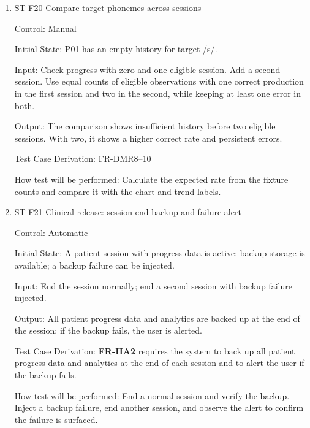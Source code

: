 \documentclass[12pt, titlepage]{article}
\begin{document}
\begin{enumerate}
Control: Manual

Initial State: An authorized auditor and synthetic patient P01 are available.

Input: Create, view, modify, export, and confirm deletion of P01. Retrieve and copy the audit log.

Output: Each operation is logged with action, information type, timestamp, actor, and patient reference. Prior events and the deletion event remain available to the authorized auditor after deletion.

Test Case Derivation: FR-DMR4, FR-DMR5 and FR-HA9

How test will be performed: Compare the captured events with the action sequence and verify retained audit history after the clinical record is removed.

\item{ST-F20 Compare target phonemes across sessions\\}

Control: Manual

Initial State: P01 has an empty history for target /s/.

Input: Check progress with zero and one eligible session. Add a second session. Use equal counts of eligible observations with one correct production in the first session and two in the second, while keeping at least one error in both.

Output: The comparison shows insufficient history before two eligible sessions. With two, it shows a higher correct rate and persistent errors.

Test Case Derivation: FR-DMR8--10

How test will be performed: Calculate the expected rate from the fixture counts and compare it with the chart and trend labels.

\item{ST-F21 Clinical release: session-end backup and failure alert\\}

Control: Automatic

Initial State: A patient session with progress data is active; backup storage is available; a backup failure can be injected.

Input: End the session normally; end a second session with backup failure injected.

Output: All patient progress data and analytics are backed up at the end of the session; if the backup fails, the user is alerted.

Test Case Derivation: \textbf{FR-HA2} requires the system to back up all patient progress data and analytics at the end of each session 
and to alert the user if the backup fails.

How test will be performed: End a normal session and verify the backup. Inject a backup failure, end another session, and observe the 
alert to confirm the failure is surfaced.

\end{enumerate}
\end{document}
